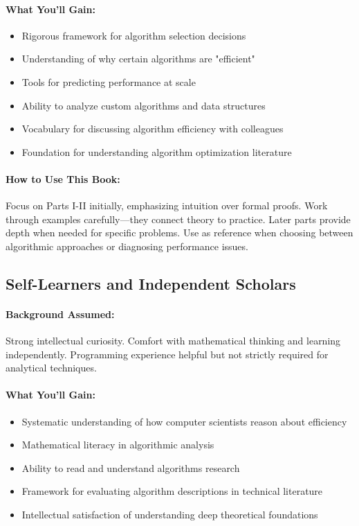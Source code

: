 \paragraph{What You'll Gain:}
\begin{itemize}
    \item Rigorous framework for algorithm selection decisions
    \item Understanding of why certain algorithms are "efficient"
    \item Tools for predicting performance at scale
    \item Ability to analyze custom algorithms and data structures
    \item Vocabulary for discussing algorithm efficiency with colleagues
    \item Foundation for understanding algorithm optimization literature
\end{itemize}

\paragraph{How to Use This Book:}
Focus on Parts I-II initially, emphasizing intuition over formal proofs. Work through examples carefully—they connect theory to practice. Later parts provide depth when needed for specific problems. Use as reference when choosing between algorithmic approaches or diagnosing performance issues.

\subsection{Self-Learners and Independent Scholars}

\paragraph{Background Assumed:}
Strong intellectual curiosity. Comfort with mathematical thinking and learning independently. Programming experience helpful but not strictly required for analytical techniques.

\paragraph{What You'll Gain:}
\begin{itemize}
    \item Systematic understanding of how computer scientists reason about efficiency
    \item Mathematical literacy in algorithmic analysis
    \item Ability to read and understand algorithms research
    \item Framework for evaluating algorithm descriptions in technical literature
    \item Intellectual satisfaction of understanding deep theoretical foundations
\end{itemize}

